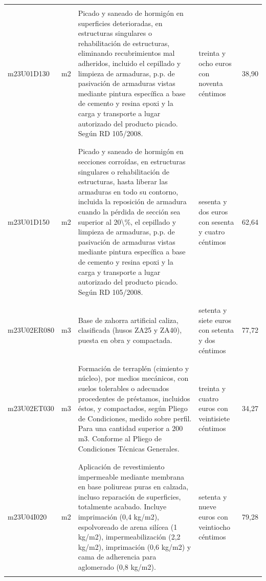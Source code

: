 \begin{supertabular}{|l|l|p{5cm}|p{3cm}|r|}
&&&&\\%
m23U01D130&m2&Picado y saneado de hormigón en superficies deterioradas, en estructuras singulares o rehabilitación de estructuras, eliminando recubrimientos mal adheridos, incluido el cepillado y limpieza de armaduras, p.p. de pasivación de armaduras vistas mediante pintura específica a base de cemento y resina epoxi y la carga y transporte a lugar autorizado del producto picado. Según RD 105/2008.&treinta y ocho euros con noventa céntimos&38,90\\%
&&&&\\%
&&&&\\%
m23U01D150&m2&Picado y saneado de hormigón en secciones corroídas, en estructuras singulares o rehabilitación de estructuras, hasta liberar las armaduras en todo su contorno, incluida la reposición de armadura cuando la pérdida de sección sea superior al 20\textbackslash{}\%, el cepillado y limpieza de armaduras, p.p. de pasivación de armaduras vistas mediante pintura específica a base de cemento y resina epoxi y la carga y transporte a lugar autorizado del producto picado. Según RD 105/2008.&sesenta y dos euros con sesenta y cuatro céntimos&62,64\\%
&&&&\\%
&&&&\\%
m23U02ER080&m3&Base de zahorra artificial caliza, clasificada (husos ZA25 y ZA40), puesta en obra y compactada.&setenta y siete euros con setenta y dos céntimos&77,72\\%
&&&&\\%
&&&&\\%
m23U02ET030&m3&Formación de terraplén (cimiento y núcleo), por medios mecánicos, con suelos tolerables o adecuados procedentes de préstamos, incluidos éstos, y compactados, según Pliego de Condiciones, medido sobre perfil. Para una cantidad superior a 200 m3. Conforme al Pliego de Condiciones Técnicas Generales.&treinta y cuatro euros con veintisiete céntimos&34,27\\%
&&&&\\%
&&&&\\%
m23U04I020&m2&Aplicación de revestimiento impermeable mediante membrana en base poliureas puras en calzada, incluso reparación de superficies, totalmente acabado. Incluye imprimación (0,4 kg/m2), espolvoreado de arena silícea (1 kg/m2), impermeabilización (2,2 kg/m2), imprimación (0,6 kg/m2) y cama de adherencia para aglomerado (0,8 kg/m2).&setenta y nueve euros con veintiocho céntimos&79,28\\%
&&&&\\%

\end{supertabular}
